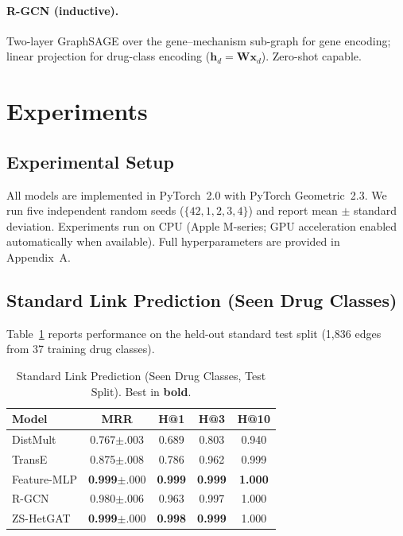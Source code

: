 \documentclass[conference]{IEEEtran}
\begin{document}
\paragraph{R-GCN (inductive).}
Two-layer GraphSAGE \cite{Hamilton2017sage} over the gene–mechanism
sub-graph for gene encoding; linear projection for drug-class encoding
($\mathbf{h}_d = \mathbf{W}\mathbf{x}_d$). Zero-shot capable.


\section{Experiments}
\label{sec:experiments}

\subsection{Experimental Setup}
All models are implemented in PyTorch~2.0 with PyTorch
Geometric~2.3. We run five independent random seeds
($\{42, 1, 2, 3, 4\}$) and report mean $\pm$ standard deviation.
Experiments run on CPU (Apple M-series; GPU acceleration enabled
automatically when available). Full hyperparameters are provided in
Appendix~A.

\subsection{Standard Link Prediction (Seen Drug Classes)}
Table~\ref{tab:standard} reports performance on the held-out standard
test split (1,836 edges from 37 training drug classes).

\begin{table}[h]
\centering
\caption{Standard Link Prediction (Seen Drug Classes, Test Split).
Best in \textbf{bold}.}
\label{tab:standard}
\begin{tabular}{lcccc}
\toprule
\textbf{Model} & \textbf{MRR} & \textbf{H@1} & \textbf{H@3} & \textbf{H@10} \\
\midrule
DistMult      & 0.767$\pm$.003 & 0.689 & 0.803 & 0.940 \\
TransE        & 0.875$\pm$.008 & 0.786 & 0.962 & 0.999 \\
Feature-MLP   & \textbf{0.999}$\pm$.000 & \textbf{0.999} & \textbf{0.999} & \textbf{1.000} \\
R-GCN         & 0.980$\pm$.006 & 0.963 & 0.997 & 1.000 \\
ZS-HetGAT     & \textbf{0.999}$\pm$.000 & \textbf{0.998} & \textbf{0.999} & 1.000 \\
\bottomrule
\end{tabular}
\end{table}
\end{document}
